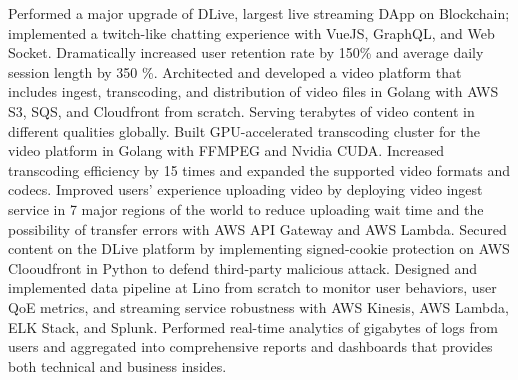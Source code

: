 \documentclass[letterpaper,MMMyyyy,nonstopmode]{simpleresumecv}
\begin{document}
\begin{Body}
\begin{Detail}
\SubBulletItem
Performed a major upgrade of DLive, largest live streaming DApp on Blockchain; implemented a twitch-like chatting experience with VueJS, GraphQL, and Web Socket. Dramatically increased user retention rate by 150\% and average daily session length by 350 \%.
\SubBulletItem
Architected and developed a video platform that includes ingest, transcoding, and distribution of video files in Golang with AWS S3, SQS, and Cloudfront from scratch. Serving terabytes of video content in different qualities globally.
\SubBulletItem
Built GPU-accelerated transcoding cluster for the video platform in Golang with FFMPEG and Nvidia CUDA. Increased transcoding efficiency by 15 times and expanded the supported video formats and codecs.
\SubBulletItem
Improved users' experience uploading video by deploying video ingest service in 7 major regions of the world to reduce uploading wait time and the possibility of transfer errors with AWS API Gateway and AWS Lambda.
\SubBulletItem
Secured content on the DLive platform by implementing signed-cookie protection on AWS Clooudfront in Python to defend third-party malicious attack.
\SubBulletItem
Designed and implemented data pipeline at Lino from scratch to monitor user behaviors, user QoE metrics, and streaming service robustness with AWS Kinesis, AWS Lambda, ELK Stack, and Splunk. Performed real-time analytics of gigabytes of logs from users and aggregated into comprehensive reports and dashboards that provides both technical and business insides.
\end{Detail}




\end{Body}
\end{document}

